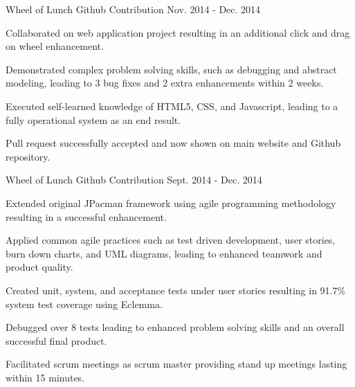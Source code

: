 \begin{cventries}
  \cvtechentry
    {Wheel of Lunch Github Contribution} %
    {} %
    {} %
    {Nov. 2014 - Dec. 2014} %
    {
      \begin{cvitems} %
        \item {Collaborated on web application project resulting in an additional click and drag on wheel enhancement.}
        \item {Demonstrated complex problem solving skills, such as debugging and abstract modeling, leading to 3 bug fixes and 2 extra enhancements within 2 weeks.}
        \item {Executed self-learned knowledge of HTML5, CSS, and Javascript, leading to a fully operational system as an end result.}
        \item {Pull request successfully accepted and now shown on main website and Github repository.}
      \end{cvitems}
    }
    
  \cvtechentry
    {Wheel of Lunch Github Contribution} %
    {} %
    {} %
    {Sept. 2014 - Dec. 2014} %
    {
      \begin{cvitems} %
        \item {Extended original JPacman framework using agile programming methodology resulting in a successful enhancement.}
        \item {Applied common agile practices such as test driven development, user stories, burn down charts, and UML diagrams, leading to enhanced teamwork and product quality.}
        \item {Created unit, system, and acceptance tests under user stories resulting in 91.7\% system test coverage using Eclemma.}
        \item {Debugged over 8 tests leading to enhanced problem solving skills and an overall successful final product.}
        \item{Facilitated scrum meetings as scrum master providing stand up meetings lasting within 15 minutes.}
      \end{cvitems}
    }
\end{cventries}

